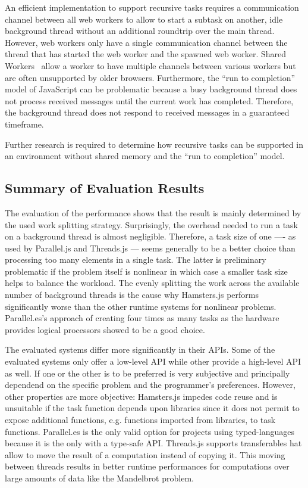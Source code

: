 An efficient implementation to support recursive tasks requires a communication channel between all web workers to allow to start a subtask on another, idle background thread without an additional roundtrip over the main thread. However, web workers only have a single communication channel between the thread that has started the web worker and the spawned web worker. Shared Workers~\cite[section 4.6.4]{w3cWebWorker} allow a worker to have multiple channels between various workers but are often unsupported by older browsers. Furthermore, the \enquote{run to completion} model of JavaScript can be problematic because a busy background thread does not process received messages until the current work has completed. Therefore, the background thread does not respond to received messages in a guaranteed timeframe.

Further research is required to determine how recursive tasks can be supported in an environment without shared memory and the \enquote{run to completion} model.

\subsection{Summary of Evaluation Results}
The evaluation of the performance shows that the result is mainly determined by the used work splitting strategy. Surprisingly, the overhead needed to run a task on a background thread is almost negligible. Therefore, a task size of one ---- as used by Parallel.js and Threads.js --- seems generally to be a better choice than processing too many elements in a single task. The latter is preliminary problematic if the problem itself is nonlinear in which case a smaller task size helps to balance the workload. The evenly splitting the work across the available number of background threads is the cause why Hamsters.js performs significantly worse than the other runtime systems for nonlinear problems. Parallel.es's approach of creating four times as many tasks as the hardware provides logical processors showed to be a good choice. 

The evaluated systems differ more significantly in their APIs. Some of the evaluated systems only offer a low-level API while other provide a high-level API as well. If one or the other is to be preferred is very subjective and principally dependend on the specific problem and the programmer's preferences. However, other properties are more objective: Hamsters.js impedes code reuse and is unsuitable if the task function depends upon libraries since it does not permit to expose additional functions, e.g. functions imported from libraries, to task functions. Parallel.es is the only valid option for projects using typed-languages because it is the only with a type-safe API. Threads.js supports transferables hat allow to move the result of a computation instead of copying it. This moving between threads results in better runtime performances for computations over large amounts of data like the Mandelbrot problem.


